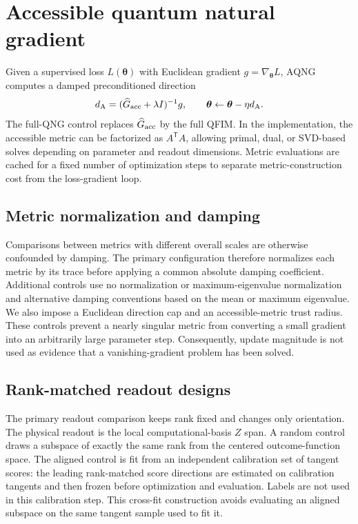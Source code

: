\section{Accessible quantum natural gradient}

Given a supervised loss $L(\bm\theta)$ with Euclidean gradient $g=\nabla_{\bm\theta}L$, AQNG computes a damped preconditioned direction
\begin{equation}
 d_{\rm A}=(\widehat G_{\rm acc}+\lambda I)^{-1}g,
 \qquad
 \bm\theta\leftarrow\bm\theta-\eta d_{\rm A}.
 \label{eq:aqng_update}
\end{equation}
The full-QNG control replaces $\widehat G_{\rm acc}$ by the full QFIM. In the implementation, the accessible metric can be factorized as $A^{\mathsf T}A$, allowing primal, dual, or SVD-based solves depending on parameter and readout dimensions. Metric evaluations are cached for a fixed number of optimization steps to separate metric-construction cost from the loss-gradient loop.

\subsection{Metric normalization and damping}
Comparisons between metrics with different overall scales are otherwise confounded by damping. The primary configuration therefore normalizes each metric by its trace before applying a common absolute damping coefficient. Additional controls use no normalization or maximum-eigenvalue normalization and alternative damping conventions based on the mean or maximum eigenvalue. We also impose a Euclidean direction cap and an accessible-metric trust radius. These controls prevent a nearly singular metric from converting a small gradient into an arbitrarily large parameter step. Consequently, update magnitude is not used as evidence that a vanishing-gradient problem has been solved.

\subsection{Rank-matched readout designs}
The primary readout comparison keeps rank fixed and changes only orientation. The physical readout is the local computational-basis $Z$ span. A random control draws a subspace of exactly the same rank from the centered outcome-function space. The aligned control is fit from an independent calibration set of tangent scores: the leading rank-matched score directions are estimated on calibration tangents and then frozen before optimization and evaluation. Labels are not used in this calibration step. This cross-fit construction avoids evaluating an aligned subspace on the same tangent sample used to fit it.

